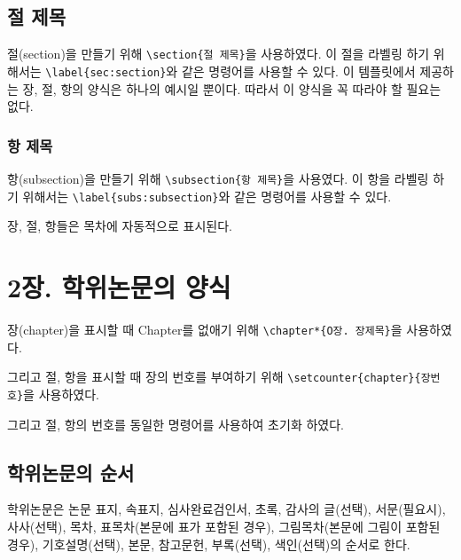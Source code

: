 \documentclass[11pt]{report}
\begin{document}
\section{절 제목}\label{sec:section}
절(section)을 만들기 위해 \verb|\section{절 제목}|을 사용하였다.
이 절을 라벨링 하기 위해서는 \verb|\label{sec:section}|와 같은 명령어를 사용할 수 있다.
이 템플릿에서 제공하는 장, 절, 항의 양식은 하나의 예시일 뿐이다.
따라서 이 양식을 꼭 따라야 할 필요는 없다.

%
\subsection{항 제목}\label{subs:subsection}
항(subsection)을 만들기 위해 \verb|\subsection{항 제목}|을 사용였다.
이 항을 라벨링 하기 위해서는 \verb|\label{subs:subsection}|와 같은 명령어를 사용할 수 있다.

장, 절, 항들은 목차에 자동적으로 표시된다.

\chapter*{2장. 학위논문의 양식}
\setcounter{chapter}{2}
\setcounter{section}{0}
\setcounter{subsection}{0}

장(chapter)을 표시할 때 Chapter를 없애기 위해 \verb|\chapter*{O장. 장제목}|을 사용하였다.\par
그리고 절, 항을 표시할 때 장의 번호를 부여하기 위해 \verb|\setcounter{chapter}{장번호}|을 사용하였다.\par
그리고 절, 항의 번호를 동일한 명령어를 사용하여 초기화 하였다.\par

\section{학위논문의 순서} \label{sec:order}


학위논문은 논문 표지, 속표지, 심사완료검인서, 초록, 감사의 글(선택), 서문(필요시), 사사(선택), 목차, 표목차(본문에 표가 포함된 경우), 그림목차(본문에 그림이 포함된 경우), 기호설명(선택), 본문, 참고문헌, 부록(선택), 색인(선택)의 순서로 한다.
\end{document}

